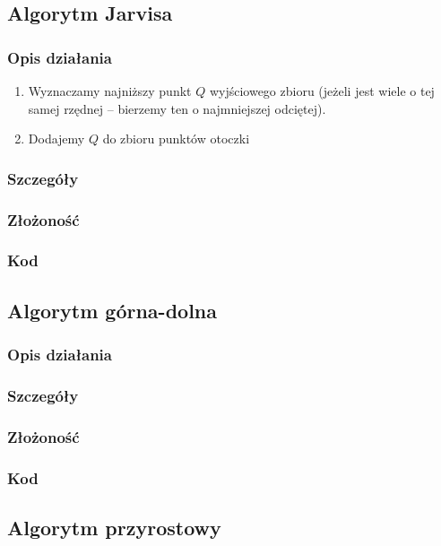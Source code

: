 \documentclass[11pt]{article}
\theoremstyle{remark} \newtheorem{definition}{def.}
\theoremstyle{definition} \newtheorem{twierdzenie}{tw.}
\begin{document}
\subsection{Algorytm Jarvisa}
    \subsubsection{Opis działania}
    \begin{enumerate}
        \item   Wyznaczamy najniższy punkt $Q$ wyjściowego zbioru (jeżeli jest wiele o tej samej rzędnej -- bierzemy ten o najmniejszej odciętej).
        \item   Dodajemy $Q$ do zbioru punktów otoczki 
    \end{enumerate}
    \subsubsection{Szczegóły}
    \subsubsection{Złożoność}
    \subsubsection{Kod}



\subsection{Algorytm górna-dolna}
    \subsubsection{Opis działania}
    \subsubsection{Szczegóły}
    \subsubsection{Złożoność}
    \subsubsection{Kod}



\subsection{Algorytm przyrostowy}
\end{document}
